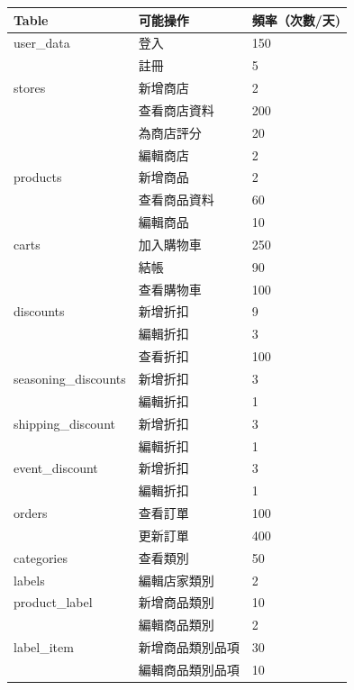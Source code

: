 \documentclass[a4paper, 12pt]{article}
\begin{document}
\noindent\begin{tabular}{ | p{12em} | p{9em} | p{9em} |}
  \hline 
  Table & 可能操作 & 頻率（次數/天)  \\
  \hline
  user_data 
        & 登入 & 150 \\
        & 註冊 & 5 \\
  \hline
  stores
        & 新增商店 & 2 \\
        & 查看商店資料 & 200 \\
        & 為商店評分 & 20 \\
        & 編輯商店 & 2 \\
  \hline
  products
        & 新增商品 & 2 \\
        & 查看商品資料 & 60 \\
        & 編輯商品 & 10 \\
  \hline
  carts
        & 加入購物車 & 250 \\
        & 結帳 & 90 \\
        & 查看購物車 & 100 \\
  \hline
  discounts 
        & 新增折扣 & 9 \\
        & 編輯折扣 & 3 \\
        & 查看折扣 & 100 \\
  \hline
  seasoning_discounts
        & 新增折扣 & 3 \\
        & 編輯折扣 & 1 \\
  \hline
  shipping_discount
        & 新增折扣 & 3 \\
        & 編輯折扣 & 1 \\
  \hline
  event_discount
        & 新增折扣 & 3 \\
        & 編輯折扣 & 1 \\
  \hline
  orders 
        & 查看訂單 & 100 \\
        & 更新訂單 & 400 \\
  \hline
  categories 
        & 查看類別 & 50 \\
  \hline
  labels 
        & 編輯店家類別 & 2 \\
  \hline
  product_label 
        & 新增商品類別 & 10 \\
        & 編輯商品類別 & 2 \\
  \hline
  label_item
        & 新增商品類別品項 & 30 \\
        & 編輯商品類別品項 & 10 \\
  \hline
\end{tabular}

\newpage
\end{document}
